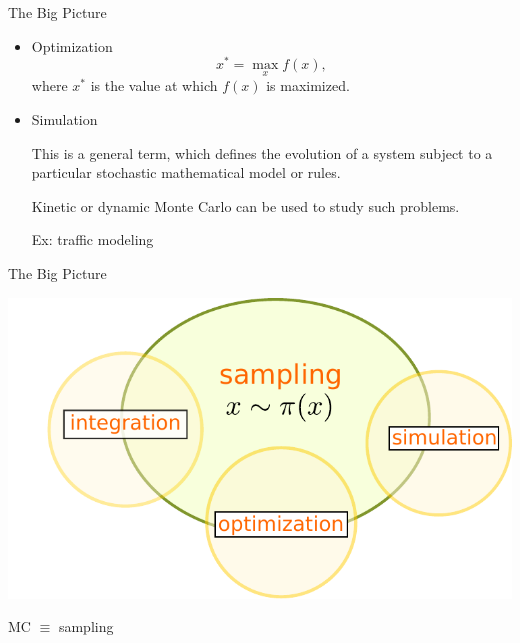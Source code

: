 \documentclass[xcolor=dvipsnames,onlymath,12pt,handout]{beamer}
\newcommand{\highlight}[1]{\textcolor{BrickRed}{#1}}
\begin{document}
\begin{frame}{The Big Picture}
\begin{itemize}
\item \highlight{Optimization}
$$x^{*} = \max_{x} f(x),$$
where $x^{*}$ is the value at which $f(x)$ is maximized.

\pause
\medskip

\item \highlight{Simulation}

\medskip

This is a general term, which defines the evolution of a system subject to a particular stochastic mathematical model or rules.

\pause
\medskip

\pause
Kinetic or dynamic Monte Carlo can be used to study such problems.

\medskip
\pause
Ex: traffic modeling 

\end{itemize}

\end{frame}


\begin{frame}{The Big Picture}
\begin{center}
	\includegraphics[scale=0.8]{figs/bigpic}

\medskip
	
	MC $\equiv$ sampling
\end{center}
\end{frame}
\end{document}
